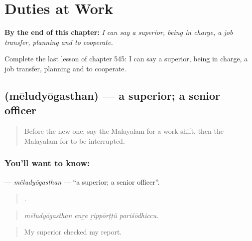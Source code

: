 
\chapter{Duties at Work}
\label{ch:ml-duties-at-work}

\begin{chapteropening}
\textbf{By the end of this chapter:} \emph{I can say a superior, being in charge, a job transfer, planning and to cooperate.}

Complete the last lesson of chapter 545: I can say a superior, being in charge, a job transfer, planning and to cooperate.
\end{chapteropening}

\section[\texorpdfstring{\ml{മേലുദ്യോഗസ്ഥൻ} (mēludyōgasthan)}{മേലുദ്യോഗസ്ഥൻ (mēludyōgasthan)}]{ (mēludyōgasthan) — a superior; a senior officer}

\label{lesson:ML-C545-meludyogasthan}



\begin{quote}
Before the new one: say the Malayalam for a work shift, then the Malayalam for to be interrupted.
\end{quote}

\subsection*{You'll want to know: }
\textbf{} — \emph{mēludyōgasthan} — \textquotedblleft{}a superior; a senior officer\textquotedblright{}.

\begin{quote}
   .
\end{quote}

\begin{quote}
\emph{mēludyōgasthan enṟe ṟippōrṭṭŭ pariśōdhiccu.}
\end{quote}

\begin{quote}
My superior checked my report.
\end{quote}


